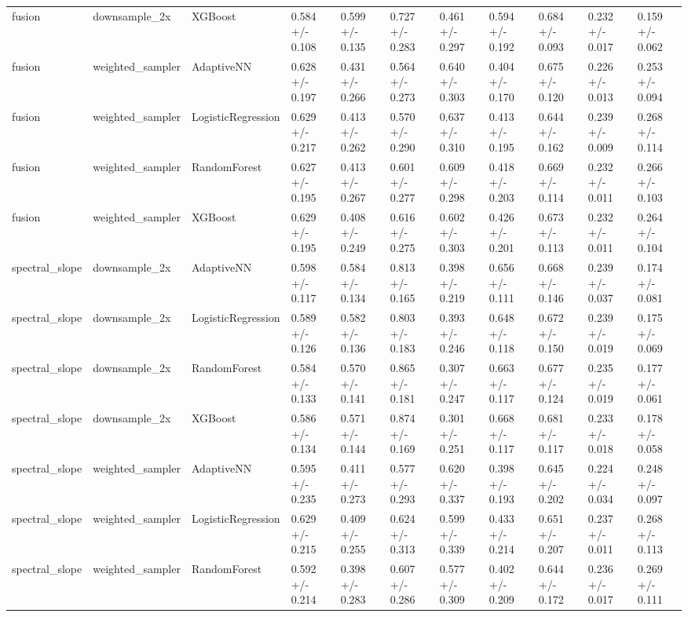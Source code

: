 \begin{tabular}{lllllllllll}
fusion & downsample_2x & XGBoost & 0.584 +/- 0.108 & 0.599 +/- 0.135 & 0.727 +/- 0.283 & 0.461 +/- 0.297 & 0.594 +/- 0.192 & 0.684 +/- 0.093 & 0.232 +/- 0.017 & 0.159 +/- 0.062 \\
fusion & weighted_sampler & AdaptiveNN & 0.628 +/- 0.197 & 0.431 +/- 0.266 & 0.564 +/- 0.273 & 0.640 +/- 0.303 & 0.404 +/- 0.170 & 0.675 +/- 0.120 & 0.226 +/- 0.013 & 0.253 +/- 0.094 \\
fusion & weighted_sampler & LogisticRegression & 0.629 +/- 0.217 & 0.413 +/- 0.262 & 0.570 +/- 0.290 & 0.637 +/- 0.310 & 0.413 +/- 0.195 & 0.644 +/- 0.162 & 0.239 +/- 0.009 & 0.268 +/- 0.114 \\
fusion & weighted_sampler & RandomForest & 0.627 +/- 0.195 & 0.413 +/- 0.267 & 0.601 +/- 0.277 & 0.609 +/- 0.298 & 0.418 +/- 0.203 & 0.669 +/- 0.114 & 0.232 +/- 0.011 & 0.266 +/- 0.103 \\
fusion & weighted_sampler & XGBoost & 0.629 +/- 0.195 & 0.408 +/- 0.249 & 0.616 +/- 0.275 & 0.602 +/- 0.303 & 0.426 +/- 0.201 & 0.673 +/- 0.113 & 0.232 +/- 0.011 & 0.264 +/- 0.104 \\
spectral_slope & downsample_2x & AdaptiveNN & 0.598 +/- 0.117 & 0.584 +/- 0.134 & 0.813 +/- 0.165 & 0.398 +/- 0.219 & 0.656 +/- 0.111 & 0.668 +/- 0.146 & 0.239 +/- 0.037 & 0.174 +/- 0.081 \\
spectral_slope & downsample_2x & LogisticRegression & 0.589 +/- 0.126 & 0.582 +/- 0.136 & 0.803 +/- 0.183 & 0.393 +/- 0.246 & 0.648 +/- 0.118 & 0.672 +/- 0.150 & 0.239 +/- 0.019 & 0.175 +/- 0.069 \\
spectral_slope & downsample_2x & RandomForest & 0.584 +/- 0.133 & 0.570 +/- 0.141 & 0.865 +/- 0.181 & 0.307 +/- 0.247 & 0.663 +/- 0.117 & 0.677 +/- 0.124 & 0.235 +/- 0.019 & 0.177 +/- 0.061 \\
spectral_slope & downsample_2x & XGBoost & 0.586 +/- 0.134 & 0.571 +/- 0.144 & 0.874 +/- 0.169 & 0.301 +/- 0.251 & 0.668 +/- 0.117 & 0.681 +/- 0.117 & 0.233 +/- 0.018 & 0.178 +/- 0.058 \\
spectral_slope & weighted_sampler & AdaptiveNN & 0.595 +/- 0.235 & 0.411 +/- 0.273 & 0.577 +/- 0.293 & 0.620 +/- 0.337 & 0.398 +/- 0.193 & 0.645 +/- 0.202 & 0.224 +/- 0.034 & 0.248 +/- 0.097 \\
spectral_slope & weighted_sampler & LogisticRegression & 0.629 +/- 0.215 & 0.409 +/- 0.255 & 0.624 +/- 0.313 & 0.599 +/- 0.339 & 0.433 +/- 0.214 & 0.651 +/- 0.207 & 0.237 +/- 0.011 & 0.268 +/- 0.113 \\
spectral_slope & weighted_sampler & RandomForest & 0.592 +/- 0.214 & 0.398 +/- 0.283 & 0.607 +/- 0.286 & 0.577 +/- 0.309 & 0.402 +/- 0.209 & 0.644 +/- 0.172 & 0.236 +/- 0.017 & 0.269 +/- 0.111 \\

\end{tabular}
